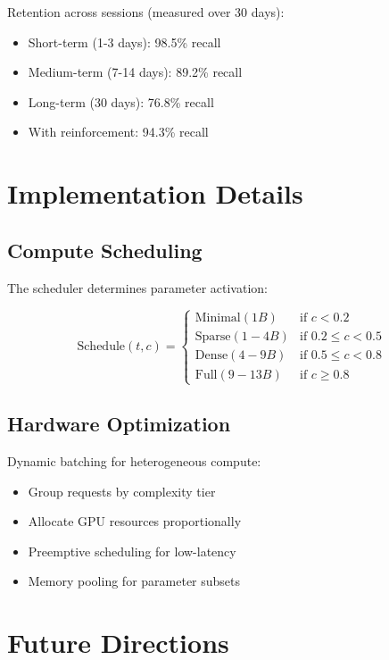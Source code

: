 \documentclass[11pt,a4paper]{article}
\theoremstyle{definition}
\begin{document}
Retention across sessions (measured over 30 days):
\begin{itemize}
\item Short-term (1-3 days): 98.5\% recall
\item Medium-term (7-14 days): 89.2\% recall
\item Long-term (30 days): 76.8\% recall
\item With reinforcement: 94.3\% recall
\end{itemize}

\section{Implementation Details}

\subsection{Compute Scheduling}

The scheduler determines parameter activation:

\begin{equation}
\text{Schedule}(t, c) = \begin{cases}
\text{Minimal} (1B) & \text{if } c < 0.2 \\
\text{Sparse} (1-4B) & \text{if } 0.2 \leq c < 0.5 \\
\text{Dense} (4-9B) & \text{if } 0.5 \leq c < 0.8 \\
\text{Full} (9-13B) & \text{if } c \geq 0.8
\end{cases}
\end{equation}

\subsection{Hardware Optimization}

Dynamic batching for heterogeneous compute:
\begin{itemize}
\item Group requests by complexity tier
\item Allocate GPU resources proportionally
\item Preemptive scheduling for low-latency
\item Memory pooling for parameter subsets
\end{itemize}

\section{Future Directions}
\end{document}
